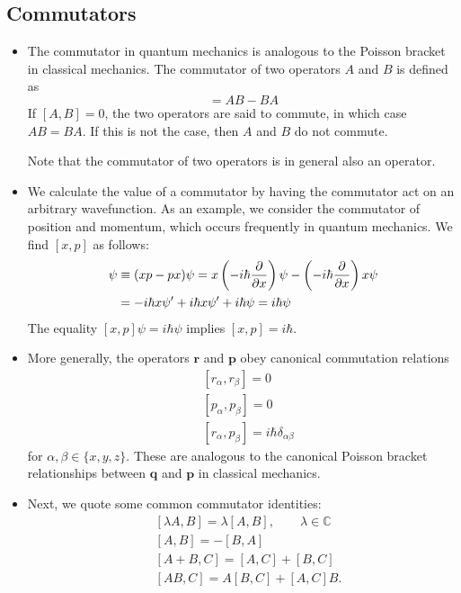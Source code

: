 \documentclass[11pt, a4paper]{article}
\renewcommand{\vec}[1]{\bm{#1}}  %
\renewcommand{\r}{\vec{r}}  %
\newcommand{\p}{\psi}  %
\begin{document}
\subsection{Commutators}
\begin{itemize}
	\item The commutator in quantum mechanics is analogous to the Poisson bracket in classical mechanics. The commutator of two operators $ A $ and $ B $ is defined as
	\begin{equation*}
		[A, B] = AB - BA
	\end{equation*}
	If $ [A, B] = 0 $, the two operators are said to commute, in which case $ AB = BA $. If this is not the case, then $ A $ and $ B $ do not commute.
	
	Note that the commutator of two operators is in general also an operator.
	
	\item We calculate the value of a commutator by having the commutator act on an arbitrary wavefunction. As an example, we consider the commutator of position and momentum, which occurs frequently in quantum mechanics. We find $ [x, p] $ as follows:
	\begin{align*}
		[x, p] \p &\equiv (xp - px)\p = x \left(- i\hbar \pdv{x}\right)\p - \left(- i\hbar \pdv{x}\right)x \p \\
		& = - i\hbar x \p ' + i \hbar x \p ' + i \hbar \p = i \hbar \p
	\end{align*}
	The equality $ [x, p] \p = i \hbar \p $ implies $ [x, p] = i \hbar $.
	
	\item More generally, the operators $ \r $ and $ \vec{p} $ obey canonical commutation relations
	\begin{align*}
		& [r_{\alpha}, r_{\beta}] = 0\\
		& [p_{\alpha}, p_{\beta}] = 0\\
		& [r_{\alpha}, p_{\beta}] = i\hbar \delta_{\alpha \beta}
	\end{align*}
	for $ \alpha, \beta \in \{x, y, z\} $. These are analogous to the canonical Poisson bracket relationships between $ \vec{q} $ and $ \vec{p} $ in classical mechanics.
	
	\item Next, we quote some common commutator identities:
	\begin{align*}
		&[\lambda A, B] = \lambda [A, B], \qquad \lambda \in \mathbb{C} \\
		&[A, B] = - [B, A]\\
		&[A + B, C] = [A, C] + [B, C]\\
		& [AB, C] = A[B, C] + [A, C]B.
	\end{align*}
	

\end{itemize}
\end{document}
